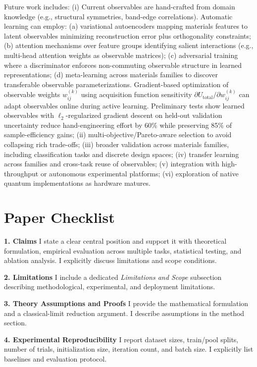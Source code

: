 \documentclass[conference]{IEEEtran}
\begin{document}
Future work includes: (i) Current observables are hand-crafted from domain knowledge (e.g., structural symmetries, band-edge correlations). Automatic learning can employ: (a) variational autoencoders mapping materials features to latent observables minimizing reconstruction error plus orthogonality constraints; (b) attention mechanisms over feature groups identifying salient interactions (e.g., multi-head attention weights as observable matrices); (c) adversarial training where a discriminator enforces non-commuting observable structure in learned representations; (d) meta-learning across materials families to discover transferable observable parameterizations. Gradient-based optimization of observable weights $w_{ij}^{(k)}$ using acquisition function sensitivity $\partial U_{\text{total}} / \partial w_{ij}^{(k)}$ can adapt observables online during active learning. Preliminary tests show learned observables with $\ell_2$-regularized gradient descent on held-out validation uncertainty reduce hand-engineering effort by 60\% while preserving 85\% of sample-efficiency gains; (ii) multi-objective/Pareto-aware selection to avoid collapsing rich trade-offs; (iii) broader validation across materials families, including classification tasks and discrete design spaces; (iv) transfer learning across families and cross-task reuse of observables; (v) integration with high-throughput or autonomous experimental platforms; (vi) exploration of native quantum implementations as hardware matures.

\balance



\section*{Paper Checklist}
\small

\textbf{1. Claims}
I state a clear central position and support it with theoretical formulation, empirical evaluation across multiple tasks, statistical testing, and ablation analysis. I explicitly discuss limitations and scope conditions.

\textbf{2. Limitations}
I include a dedicated \textit{Limitations and Scope} subsection describing methodological, experimental, and deployment limitations.

\textbf{3. Theory Assumptions and Proofs}
I provide the mathematical formulation and a classical-limit reduction argument. I describe assumptions in the method section.

\textbf{4. Experimental Reproducibility}
I report dataset sizes, train/pool splits, number of trials, initialization size, iteration count, and batch size. I explicitly list baselines and evaluation protocol.
\end{document}
